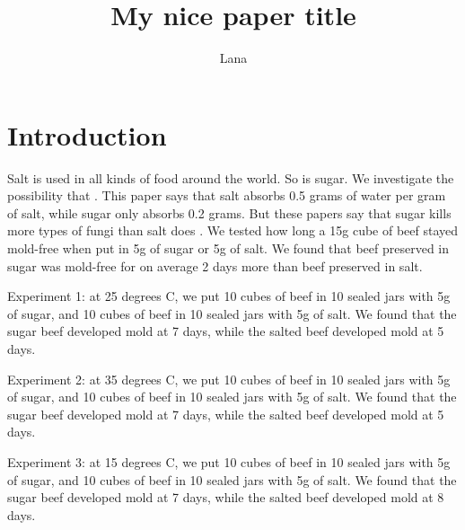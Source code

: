 \documentclass{article}
\title{My nice paper title}
\author{Lana}
\date{ }
\begin{document}
\maketitle

\section{Introduction}

Salt is used in all kinds of food around the world. So is sugar.  We investigate the possibility that .
This paper says that salt absorbs 0.5 grams of water per gram of salt, while sugar only absorbs 0.2 grams. But these papers say that sugar kills more types of fungi than salt does
.
We tested how long a 15g cube of beef stayed mold-free when put in 5g of sugar or 5g of salt. We found that beef preserved in sugar was mold-free for on average 2 days more than beef preserved in salt.

Experiment 1: at 25 degrees C, we put 10 cubes of beef in 10 sealed jars with 5g of sugar, and 10 cubes of beef in 10 sealed jars with 5g of salt.
 We found that the sugar beef developed mold at 7 days, while the salted beef developed mold at 5 days.

Experiment 2: at 35 degrees C, we put 10 cubes of beef in 10 sealed jars with 5g of sugar, and 10 cubes of beef in 10 sealed jars with 5g of salt.
 We found that the sugar beef developed mold at 7 days, while the salted beef developed mold at 5 days.

Experiment 3: at 15 degrees C, we put 10 cubes of beef in 10 sealed jars with 5g of sugar, and 10 cubes of beef in 10 sealed jars with 5g of salt.
 We found that the sugar beef developed mold at 7 days, while the salted beef developed mold at 8 days.





\footnotesize{


}

\clearpage
\printhealthcheck
\end{document}

